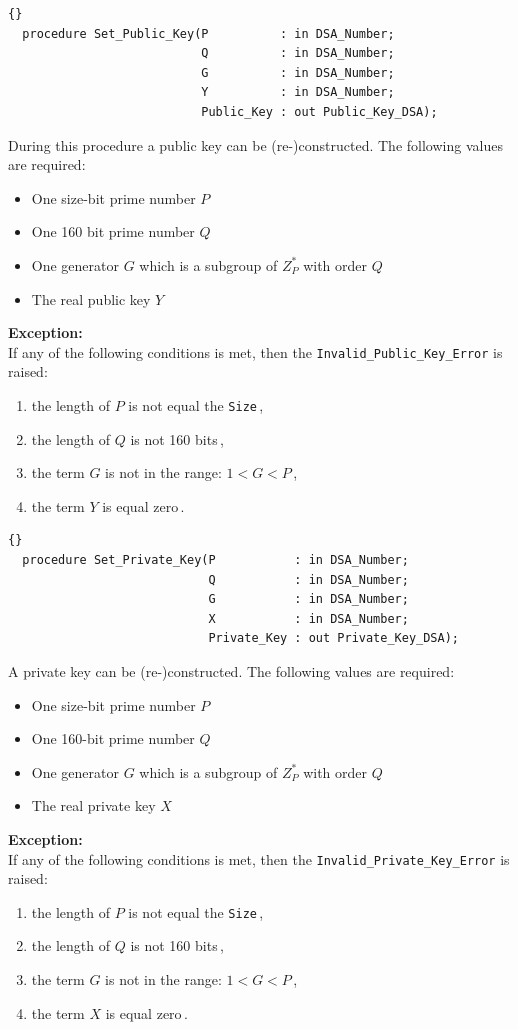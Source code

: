\hhline
\begin{lstlisting}{}
  procedure Set_Public_Key(P          : in DSA_Number;
                           Q          : in DSA_Number;
                           G          : in DSA_Number;
                           Y          : in DSA_Number;
                           Public_Key : out Public_Key_DSA);
\end{lstlisting}
During this procedure a public key can be (re-)constructed. The
following values are required:
\begin{itemize}
\item One size-bit prime number $P$
\item One 160 bit prime number $Q$
\item One generator $G$ which is a subgroup of $Z^*_P$ with order $Q$
\item The real public key $Y$
\end{itemize}
\textbf{Exception:}\\
 If any of the following conditions is met, then the
 \texttt{Invalid\_Public\_Key\_Error} is raised:
\begin{enumerate}
\item the length of $P$ is not equal the \texttt{Size}\,,
\item the length of $Q$ is not 160 bits\,,
\item the term $G$ is not in the range: $1<G<P$\,,
\item the term $Y$ is equal zero\,.
\end{enumerate}

\hhline
\begin{lstlisting}{}
  procedure Set_Private_Key(P           : in DSA_Number;
                            Q           : in DSA_Number;
                            G           : in DSA_Number;
                            X           : in DSA_Number;
                            Private_Key : out Private_Key_DSA);
\end{lstlisting}
A private key can be (re-)constructed. The following values are required:
\begin{itemize}
\item One size-bit prime number $P$
\item One 160-bit prime number $Q$
\item One generator $G$ which is a subgroup of $Z^*_P$ with order $Q$
\item The real private key $X$
\end{itemize}
\noindent\textbf{Exception:}\\ 
If any of the following conditions is met, then the
\texttt{Invalid\_Private\_Key\_Error} is raised:
\begin{enumerate}
\item the length of $P$ is not equal the \texttt{Size}\,,
\item the length of $Q$ is not 160 bits\,,
\item the term $G$ is not in the range: $1<G<P$\,,
\item the term $X$ is equal zero\,.
\end{enumerate}


